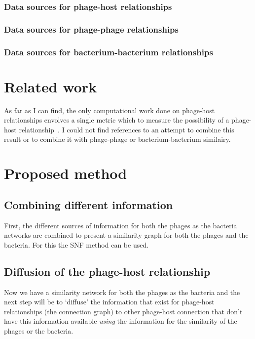 \documentclass{article}
\begin{document}
\subsubsection{Data sources for phage-host relationships}

\subsubsection{Data sources for phage-phage relationships}

\subsubsection{Data sources for bacterium-bacterium relationships}

\section{Related work}

As far as I can find, the only computational work done on phage-host relationships 
envolves a single metric which to measure the possibility of a phage-host relationship~\cite{edwards2016computational}.
I could not find references to an attempt to combine this result or to combine
it with phage-phage or bacterium-bacterium similairy.

\section{Proposed method}

\subsection{Combining different information}

First, the different sources of information for both the phages as the bacteria networks
are combined to present a similarity graph for both the phages and the bacteria.
For this the SNF method can be used.

\subsection{Diffusion of the phage-host relationship}

Now we have a similarity network for both the phages as the bacteria and the next
step will be to `diffuse' the information that exist for phage-host 
relationships (the connection graph) 
to other phage-host connection that don't have this information
available \textit{using} the information for the similarity of the phages
or the bacteria.
\end{document}

